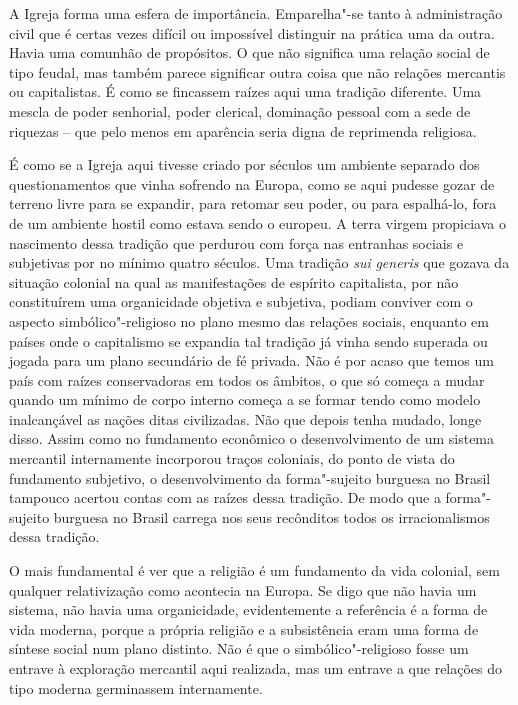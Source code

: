 {A Igreja forma uma esfera de importância. Emparelha"-se tanto à
administração civil que é certas vezes difícil ou impossível distinguir
na prática uma da outra. Havia uma comunhão de propósitos. O que não
significa uma relação social de tipo feudal, mas também parece
significar outra coisa que não relações mercantis ou capitalistas. É
como se fincassem raízes aqui uma tradição diferente. Uma mescla de
poder senhorial, poder clerical, dominação pessoal com a sede de
riquezas -- que pelo menos em aparência seria digna de reprimenda
religiosa.

É como se a Igreja aqui tivesse criado por séculos um ambiente separado
dos questionamentos que vinha sofrendo na Europa, como se aqui pudesse
gozar de terreno livre para se expandir, para retomar seu poder, ou para
espalhá-lo, fora de um ambiente hostil como estava sendo o europeu. A
terra virgem propiciava o nascimento dessa tradição que perdurou com
força nas entranhas sociais e subjetivas por no mínimo quatro séculos.
Uma tradição \emph{sui} \emph{generis} que gozava da situação colonial
na qual as manifestações de espírito capitalista, por não constituírem
uma organicidade objetiva e subjetiva, podiam conviver com o aspecto
simbólico"-religioso no plano mesmo das relações sociais, enquanto em
países onde o capitalismo se expandia tal tradição já vinha sendo
superada ou jogada para um plano secundário de fé privada. Não é por
acaso que temos um país com raízes conservadoras em todos os âmbitos, o
que só começa a mudar quando um mínimo de corpo interno começa a se
formar tendo como modelo inalcançável as nações ditas civilizadas. Não
que depois tenha mudado, longe disso. Assim como no fundamento econômico
o desenvolvimento de um sistema mercantil internamente incorporou traços
coloniais, do ponto de vista do fundamento subjetivo, o desenvolvimento
da forma"-sujeito burguesa no Brasil tampouco acertou contas com as
raízes dessa tradição. De modo que a forma"-sujeito burguesa no Brasil
carrega nos seus recônditos todos os irracionalismos dessa tradição.

O mais fundamental é ver que a religião é um fundamento da vida
colonial, sem qualquer relativização como acontecia na Europa. Se
digo que não havia um sistema, não havia uma organicidade,
evidentemente a referência é a forma de vida moderna, porque a própria
religião e a subsistência eram uma forma de síntese social num plano
distinto. Não é que o simbólico"-religioso fosse um entrave à exploração
mercantil aqui realizada, mas um entrave a que relações do tipo moderna
germinassem internamente.

}

